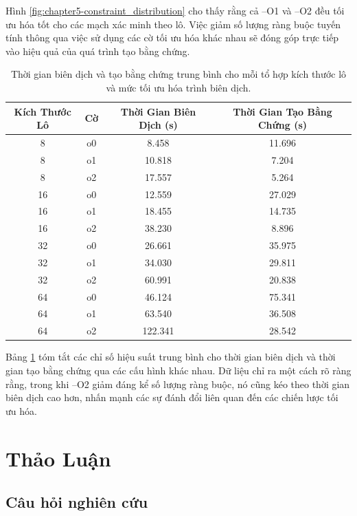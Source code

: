 Hình \ref{fig:chapter5-constraint_distribution} cho thấy rằng cả --O1 và --O2 đều tối ưu hóa tốt cho các mạch xác minh theo lô. Việc giảm số lượng ràng buộc tuyến tính thông qua việc sử dụng các cờ tối ưu hóa khác nhau sẽ đóng góp trực tiếp vào hiệu quả của quá trình tạo bằng chứng.


\begin{table}[H]
    \centering
    \caption{Thời gian biên dịch và tạo bằng chứng trung bình cho mỗi tổ hợp kích thước lô và mức tối ưu hóa trình biên dịch.}
    \begin{tabular}{|c|c|c|c|}
        \hline
        \textbf{Kích Thước Lô} & \textbf{Cờ} & \textbf{Thời Gian Biên Dịch (s)} & \textbf{Thời Gian Tạo Bằng Chứng (s)} \\
        \hline
        8   & o0 & 8.458  & 11.696 \\
        8   & o1 & 10.818 & 7.204  \\
        8   & o2 & 17.557 & 5.264  \\
        \hline
        16  & o0 & 12.559 & 27.029 \\
        16  & o1 & 18.455 & 14.735 \\
        16  & o2 & 38.230 & 8.896  \\
        \hline
        32  & o0 & 26.661 & 35.975 \\
        32  & o1 & 34.030 & 29.811 \\
        32  & o2 & 60.991 & 20.838 \\
        \hline
        64  & o0 & 46.124 & 75.341 \\
        64  & o1 & 63.540 & 36.508 \\
        64  & o2 & 122.341 & 28.542 \\
        \hline
    \end{tabular}
    \label{tab:average_performance}
\end{table}

Bảng \ref{tab:average_performance} tóm tắt các chỉ số hiệu suất trung bình cho thời gian biên dịch và thời gian tạo bằng chứng qua các cấu hình khác nhau. Dữ liệu chỉ ra một cách rõ ràng rằng, trong khi --O2 giảm đáng kể số lượng ràng buộc, nó cũng kéo theo thời gian biên dịch cao hơn, nhấn mạnh các sự đánh đổi liên quan đến các chiến lược tối ưu hóa.

\section{Thảo Luận}

    \subsection{Câu hỏi nghiên cứu}
    
